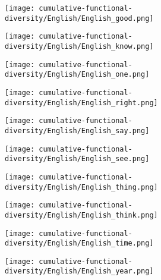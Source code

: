 \begin{figure}

  \caption{Cumulative functional diversity of high-frequency lexical items in English}
  \label{fig:cumulative-functional-diversity-English-items}
  \centering

  \begin{subfigure}{0.5\linewidth}
    \centering
    \caption{}
    \texttt{[image: cumulative-functional-diversity/English/English\_good.png]}
  \end{subfigure}%
  \begin{subfigure}{0.5\linewidth}
    \centering
    \caption{}
    \texttt{[image: cumulative-functional-diversity/English/English\_know.png]}
  \end{subfigure}

  \begin{subfigure}{0.5\linewidth}
    \centering
    \caption{}
    \texttt{[image: cumulative-functional-diversity/English/English\_one.png]}
  \end{subfigure}%
  \begin{subfigure}{0.5\linewidth}
    \centering
    \caption{}
    \texttt{[image: cumulative-functional-diversity/English/English\_right.png]}
  \end{subfigure}

  \begin{subfigure}{0.5\linewidth}
    \centering
    \caption{}
    \texttt{[image: cumulative-functional-diversity/English/English\_say.png]}
  \end{subfigure}%
  \begin{subfigure}{0.5\linewidth}
    \centering
    \caption{}
    \texttt{[image: cumulative-functional-diversity/English/English\_see.png]}
  \end{subfigure}

  \begin{subfigure}{0.5\linewidth}
    \centering
    \caption{}
    \texttt{[image: cumulative-functional-diversity/English/English\_thing.png]}
  \end{subfigure}%
  \begin{subfigure}{0.5\linewidth}
    \centering
    \caption{}
    \texttt{[image: cumulative-functional-diversity/English/English\_think.png]}
  \end{subfigure}

  \begin{subfigure}{0.5\linewidth}
    \centering
    \caption{}
    \texttt{[image: cumulative-functional-diversity/English/English\_time.png]}
  \end{subfigure}%
  \begin{subfigure}{0.5\linewidth}
    \centering
    \caption{}
    \texttt{[image: cumulative-functional-diversity/English/English\_year.png]}
  \end{subfigure}

\end{figure}

